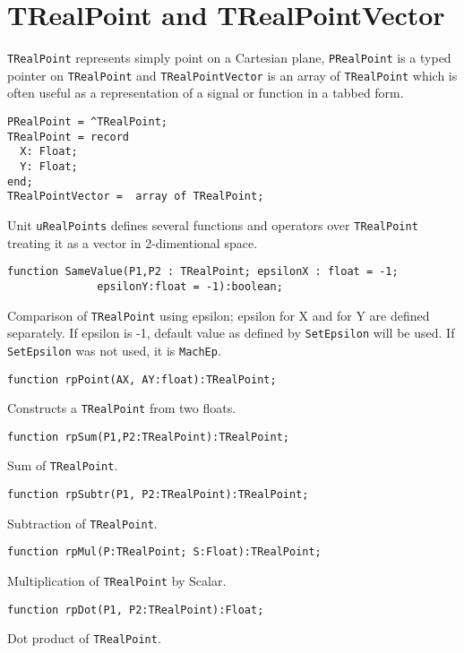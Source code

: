 \documentclass[12pt,a4paper,oneside]{article}
\newcommand{\code}[1]{\texttt{#1}}
\begin{document}
\section{TRealPoint and TRealPointVector}
\label{sec:trealpoint}
\code{TRealPoint} represents simply point on a Cartesian plane, \code{PRealPoint} is a typed pointer on \code{TRealPoint} and \code{TRealPointVector} is an array of \code{TRealPoint} which is often useful as a representation of a signal or function in a tabbed form.
\begin{verbatim}
PRealPoint = ^TRealPoint;
TRealPoint = record
  X: Float;
  Y: Float;
end;
TRealPointVector =  array of TRealPoint;
\end{verbatim}
\noindent
Unit \code{uRealPoints} defines several functions and operators over \code{TRealPoint} treating it as a vector in 2-dimentional space.
\begin{verbatim}
function SameValue(P1,P2 : TRealPoint; epsilonX : float = -1; 
              epsilonY:float = -1):boolean;
\end{verbatim}
Comparison of \code{TRealPoint} using epsilon; epsilon for X and for Y are defined separately. If epsilon is -1, default value as defined by \code{SetEpsilon} will be used. If \code{SetEpsilon} was not used, it is \code{MachEp}.
\begin{verbatim}
function rpPoint(AX, AY:float):TRealPoint;
\end{verbatim}\vspace{-6pt}
Constructs a \code{TRealPoint} from two floats.

\begin{verbatim}
function rpSum(P1,P2:TRealPoint):TRealPoint;
\end{verbatim}\vspace{-6pt}
Sum of \code{TRealPoint}.

\begin{verbatim}
function rpSubtr(P1, P2:TRealPoint):TRealPoint;
\end{verbatim}\vspace{-6pt}
Subtraction of \code{TRealPoint}.

\begin{verbatim}
function rpMul(P:TRealPoint; S:Float):TRealPoint;
\end{verbatim}\vspace{-6pt}
Multiplication of \code{TRealPoint} by Scalar.

\begin{verbatim}
function rpDot(P1, P2:TRealPoint):Float;
\end{verbatim}\vspace{-6pt}
Dot product of \code{TRealPoint}.
\end{document}

